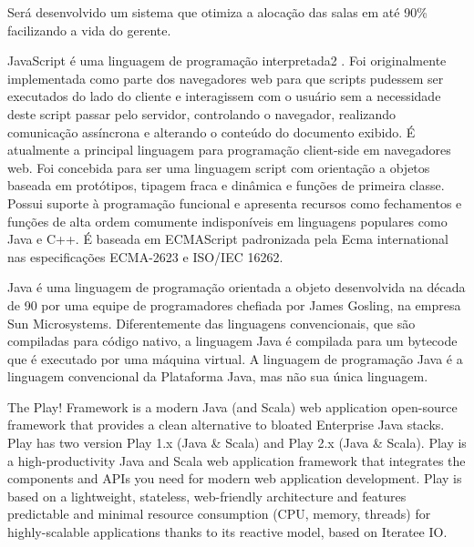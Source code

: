 \documentclass{abntpuc}
\begin{document}






%



Será desenvolvido um sistema que otimiza a alocação das salas em até 90\% facilizando a vida do gerente.




	JavaScript é uma linguagem de programação interpretada2 . Foi originalmente implementada como parte dos navegadores web para que scripts pudessem ser executados do lado do cliente e interagissem com o usuário sem a necessidade deste script passar pelo servidor, controlando o navegador, realizando comunicação assíncrona e alterando o conteúdo do documento exibido.
	É atualmente a principal linguagem para programação client-side em navegadores web. Foi concebida para ser uma linguagem script com orientação a objetos baseada em protótipos, tipagem fraca e dinâmica e funções de primeira classe. Possui suporte à programação funcional e apresenta recursos como fechamentos e funções de alta ordem comumente indisponíveis em linguagens populares como Java e C++.
	É baseada em ECMAScript padronizada pela Ecma international nas especificações ECMA-2623 e ISO/IEC 16262.

	Java é uma linguagem de programação orientada a objeto desenvolvida na década de 90 por uma equipe de programadores chefiada por James Gosling, na empresa Sun Microsystems. Diferentemente das linguagens convencionais, que são compiladas para código nativo, a linguagem Java é compilada para um bytecode que é executado por uma máquina virtual. A linguagem de programação Java é a linguagem convencional da Plataforma Java, mas não sua única linguagem.


	The Play! Framework is a modern Java (and Scala) web application open-source framework that provides a clean alternative to bloated Enterprise Java stacks. Play has two version Play 1.x (Java & Scala) and Play 2.x (Java & Scala).
	Play is a high-productivity Java and Scala web application framework that integrates the components and APIs you need for modern web application development.
	Play is based on a lightweight, stateless, web-friendly architecture and features predictable and minimal resource consumption (CPU, memory, threads) for highly-scalable applications thanks to its reactive model, based on Iteratee IO.\par
\end{document}
